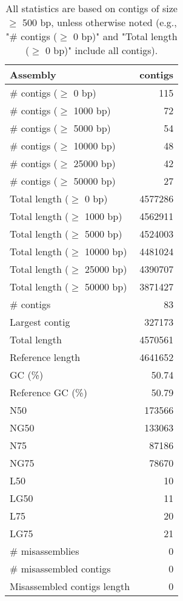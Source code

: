 \documentclass[12pt,a4paper]{article}
\begin{document}
\begin{table}[ht]
\begin{center}
\caption{All statistics are based on contigs of size $\geq$ 500 bp, unless otherwise noted (e.g., "\# contigs ($\geq$ 0 bp)" and "Total length ($\geq$ 0 bp)" include all contigs).}
\begin{tabular}{|l*{1}{|r}|}
\hline
Assembly & contigs \\ \hline
\# contigs ($\geq$ 0 bp) & 115 \\ \hline
\# contigs ($\geq$ 1000 bp) & 72 \\ \hline
\# contigs ($\geq$ 5000 bp) & 54 \\ \hline
\# contigs ($\geq$ 10000 bp) & 48 \\ \hline
\# contigs ($\geq$ 25000 bp) & 42 \\ \hline
\# contigs ($\geq$ 50000 bp) & 27 \\ \hline
Total length ($\geq$ 0 bp) & 4577286 \\ \hline
Total length ($\geq$ 1000 bp) & 4562911 \\ \hline
Total length ($\geq$ 5000 bp) & 4524003 \\ \hline
Total length ($\geq$ 10000 bp) & 4481024 \\ \hline
Total length ($\geq$ 25000 bp) & 4390707 \\ \hline
Total length ($\geq$ 50000 bp) & 3871427 \\ \hline
\# contigs & 83 \\ \hline
Largest contig & 327173 \\ \hline
Total length & 4570561 \\ \hline
Reference length & 4641652 \\ \hline
GC (\%) & 50.74 \\ \hline
Reference GC (\%) & 50.79 \\ \hline
N50 & 173566 \\ \hline
NG50 & 133063 \\ \hline
N75 & 87186 \\ \hline
NG75 & 78670 \\ \hline
L50 & 10 \\ \hline
LG50 & 11 \\ \hline
L75 & 20 \\ \hline
LG75 & 21 \\ \hline
\# misassemblies & 0 \\ \hline
\# misassembled contigs & 0 \\ \hline
Misassembled contigs length & 0 \\ \hline

\end{tabular}
\end{center}
\end{table}
\end{document}
